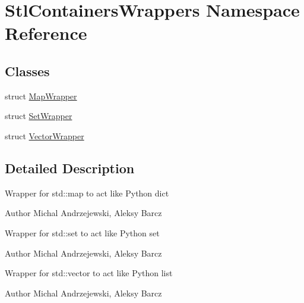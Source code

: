 \hypertarget{namespace_stl_containers_wrappers}{
\section{StlContainersWrappers Namespace Reference}
\label{namespace_stl_containers_wrappers}
}
\subsection*{Classes}
\begin{DoxyCompactItemize}
\item 
struct \hyperlink{struct_stl_containers_wrappers_1_1_map_wrapper}{MapWrapper}
\item 
struct \hyperlink{struct_stl_containers_wrappers_1_1_set_wrapper}{SetWrapper}
\item 
struct \hyperlink{struct_stl_containers_wrappers_1_1_vector_wrapper}{VectorWrapper}
\end{DoxyCompactItemize}


\subsection{Detailed Description}
Wrapper for std::map to act like Python dict

\begin{DoxyAuthor}{Author}
Michal Andrzejewski, Aleksy Barcz
\end{DoxyAuthor}
Wrapper for std::set to act like Python set

\begin{DoxyAuthor}{Author}
Michal Andrzejewski, Aleksy Barcz
\end{DoxyAuthor}
Wrapper for std::vector to act like Python list

\begin{DoxyAuthor}{Author}
Michal Andrzejewski, Aleksy Barcz 
\end{DoxyAuthor}
